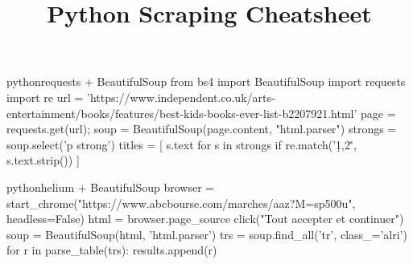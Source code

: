 \documentclass[10pt,a4paper]{article}
\title{\color{w3schools}Python Scraping Cheatsheet
}
\begin{document}
\maketitle

\small
\begin{multicols}{3}

\thispagestyle{empty}
\scriptsize



\begin{codebox}{python}{requests + BeautifulSoup}
from bs4 import BeautifulSoup
import requests
import re
url = 'https://www.independent.co.uk/arts-entertainment/books/features/best-kids-books-ever-list-b2207921.html'
page = requests.get(url);
soup = BeautifulSoup(page.content, "html.parser")
strongs = soup.select('p strong')
titles = [ s.text for s in strongs if re.match('\d{1,2}\.', s.text.strip()) ]

\end{codebox}

\begin{codebox}{python}{helium + BeautifulSoup}
browser = start_chrome("https://www.abcbourse.com/marches/aaz?M=sp500u", headless=False)
html = browser.page_source
click("Tout accepter et continuer")
soup = BeautifulSoup(html, 'html.parser')
trs = soup.find_all('tr', class_='alri')
for r in parse_table(trs):
   results.append(r)

\end{codebox}


\AtNextBibliography{\footnotesize}
\printbibliography  
\end{multicols}
\end{document}
